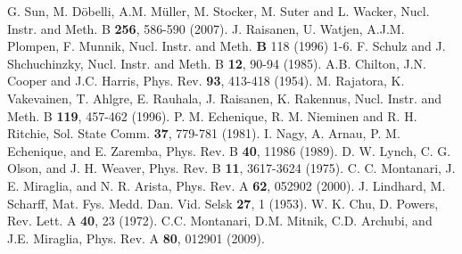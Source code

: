 \documentclass[aps,prb,reprint,groupedaddress]{revtex4-1}
\begin{document}
\begin{thebibliography}{00}
 G. Sun, M. D\"{o}belli, A.M. M\"{u}ller, M. Stocker, M. Suter and L. Wacker, Nucl. Instr. and Meth. B \textbf{256}, 586-590 (2007).
 J. Raisanen, U. Watjen, A.J.M. Plompen, F. Munnik, Nucl. Instr. and Meth. \textbf{B} 118 (1996) 1-6.
 F. Schulz and J. Shchuchinzky, Nucl. Instr. and Meth. B \textbf{12},  90-94 (1985).
 A.B. Chilton, J.N. Cooper and J.C. Harris, Phys. Rev. \textbf{93}, 413-418  (1954).
 M. Rajatora, K. Vakevainen, T. Ahlgre, E. Rauhala, J. Raisanen, K. Rakennus, Nucl. Instr. and Meth. B \textbf{119}, 457-462 (1996).
 P. M. Echenique, R. M. Nieminen and R. H. Ritchie, Sol. State Comm. \textbf{37}, 779-781 (1981).
 I. Nagy, A. Arnau, P. M. Echenique, and E. Zaremba, Phys. Rev. B \textbf{40}, 11986 (1989).
 D. W. Lynch, C. G. Olson, and J. H. Weaver, Phys. Rev. B \textbf{11}, 3617-3624 (1975).
 C. C. Montanari, J. E. Miraglia, and N. R. Arista, Phys. Rev. A \textbf{62}, 052902 (2000).
 J. Lindhard, M. Scharff,  Mat. Fys. Medd. Dan. Vid. Selsk  \textbf{27}, 1 (1953).
 W. K. Chu, D. Powers, Rev. Lett. A \textbf{40}, 23 (1972).
 C.C. Montanari, D.M. Mitnik, C.D. Archubi, and J.E. Miraglia, Phys. Rev. A \textbf{80}, 012901 (2009).

\end{thebibliography}
\end{document}
